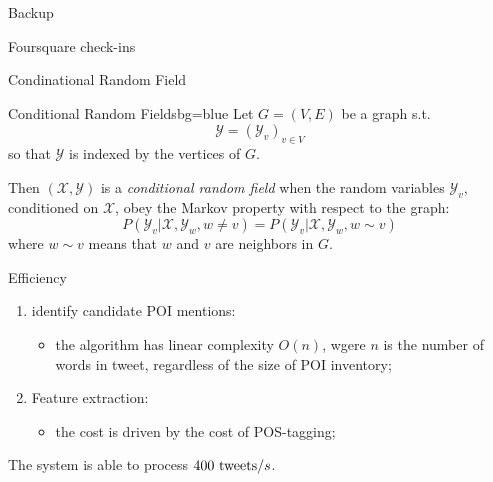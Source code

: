
\begin{frame}
\begin{Huge}
Backup 
\end{Huge}
\end{frame}

\begin{frame}{Foursquare check-ins}
  \begin{center}
  \end{center}
\end{frame}

\begin{frame}{Condinational Random Field}
  \begin{center}
    \begin{variableblock}{Conditional Random Fields}{}{bg=blue}
      Let $G = (V, E)$ be a graph s.t.
      \begin{equation}
	\mathcal{Y} = (\mathcal{Y}_v)_{v\in V} 
      \end{equation}
      so that $\mathcal{Y}$ is indexed by the vertices of $G$.
      
      Then $(\mathcal{X}, \mathcal{Y})$ is a \emph{conditional random field} when the random variables 
      $\mathcal{Y}_v$, conditioned on $\mathcal{X}$, obey the \alert{Markov property}
      with respect to the graph:
      \begin{equation}
	P(\mathcal{Y}_v |\mathcal{X}, \mathcal{Y}_w, w \neq v) = P(\mathcal{Y}_v |\mathcal{X}, \mathcal{Y}_w, w \sim v)
      \end{equation}
      where $\mathit{w} \sim v$ means that $w$ and $v$ are neighbors in $G$.
    \end{variableblock}
  \end{center}

\end{frame}

\begin{frame}{Efficiency}
  \begin{enumerate}
    \item identify candidate POI mentions:
    \begin{itemize}
      \item the algorithm has linear complexity $O(n)$, wgere $n$ is the number of words in tweet, regardless of the size of POI inventory;
    \end{itemize}
    \item Feature extraction:
    \begin{itemize}
      \item the cost is driven by the cost of POS-tagging;
    \end{itemize}
  \end{enumerate}
  The system is able to process $400~\textmd{tweets}/s$.
\end{frame}

